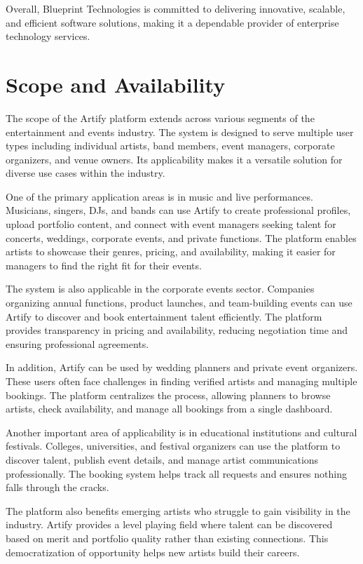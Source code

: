 \documentclass[12pt,a4paper]{report}
\begin{document}
Overall, Blueprint Technologies is committed to delivering innovative, scalable, and efficient software solutions, making it a dependable provider of enterprise technology services.

\section{Scope and Availability}
The scope of the Artify platform extends across various segments of the entertainment and events industry. The system is designed to serve multiple user types including individual artists, band members, event managers, corporate organizers, and venue owners. Its applicability makes it a versatile solution for diverse use cases within the industry.

One of the primary application areas is in music and live performances. Musicians, singers, DJs, and bands can use Artify to create professional profiles, upload portfolio content, and connect with event managers seeking talent for concerts, weddings, corporate events, and private functions. The platform enables artists to showcase their genres, pricing, and availability, making it easier for managers to find the right fit for their events.

The system is also applicable in the corporate events sector. Companies organizing annual functions, product launches, and team-building events can use Artify to discover and book entertainment talent efficiently. The platform provides transparency in pricing and availability, reducing negotiation time and ensuring professional agreements.

In addition, Artify can be used by wedding planners and private event organizers. These users often face challenges in finding verified artists and managing multiple bookings. The platform centralizes the process, allowing planners to browse artists, check availability, and manage all bookings from a single dashboard.

Another important area of applicability is in educational institutions and cultural festivals. Colleges, universities, and festival organizers can use the platform to discover talent, publish event details, and manage artist communications professionally. The booking system helps track all requests and ensures nothing falls through the cracks.

The platform also benefits emerging artists who struggle to gain visibility in the industry. Artify provides a level playing field where talent can be discovered based on merit and portfolio quality rather than existing connections. This democratization of opportunity helps new artists build their careers.
\end{document}
